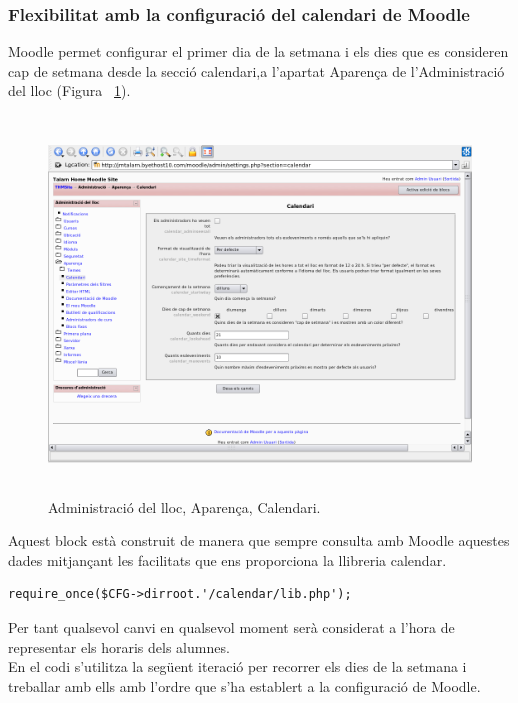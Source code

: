 \documentclass[a4paper]{report}  %
\begin{document}
\subsubsection{Flexibilitat amb la configuració del calendari de Moodle}
Moodle permet configurar el primer dia de la setmana i els dies que es consideren cap de setmana desde la secció calendari,a l'apartat Aparença de l'Administració del lloc (Figura ~\ref{fig:AdministracioCalendari}).\\
		\begin{figure}[H] %
		\begin{center}
		\includegraphics[width=12cm,height=10cm]{img/AdministracioCalendari.png}
		\caption[List caption]{Administració del lloc, Aparença, Calendari.}
		\label{fig:AdministracioCalendari}
		\end{center}
		\end{figure}
Aquest block està construit de manera que sempre consulta amb Moodle aquestes dades mitjançant les facilitats que ens proporciona la llibreria calendar.
\begin{lstlisting}[style=PHP,caption=Importació de la llibreria PHP necessària per manegar les  dades del calendari.]
	require_once($CFG->dirroot.'/calendar/lib.php');  
\end{lstlisting}
Per tant qualsevol canvi en qualsevol moment serà considerat a l'hora de representar els horaris dels alumnes.\\	
En el codi s'utilitza la següent iteració per recorrer els dies de la setmana i treballar amb ells amb l'ordre que s'ha establert a la configuració de Moodle.
\end{document}

